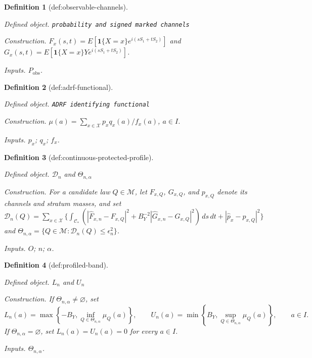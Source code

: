 \documentclass{article}
\newtheorem{definition}{Definition}
\begin{document}
\begin{definition}[def:observable-channels]\label{def:observable-channels}
\par\smallskip\noindent\emph{Defined object.} \texttt{probability and signed marked channels}
\par\smallskip\noindent\emph{Construction.} \(F_x(s,t)=E[\mathbf 1\{X=x\}e^{i(sS_1+tS_2)}]\) and \(G_x(s,t)=E[\mathbf 1\{X=x\}Ye^{i(sS_1+tS_2)}]\).
\par\smallskip\noindent\emph{Inputs.} \(P_{\mathrm{obs}}\).
\end{definition}

\begin{definition}[def:adrf-functional]\label{def:adrf-functional}
\par\smallskip\noindent\emph{Defined object.} \texttt{ADRF identifying functional}
\par\smallskip\noindent\emph{Construction.} \(\mu(a)=\sum_{x\in\mathcal X}p_xq_x(a)/f_x(a)\), \(a\in I\).
\par\smallskip\noindent\emph{Inputs.} \(p_x\); \(q_x\); \(f_x\).
\end{definition}

\begin{definition}[def:continuous-protected-profile]\label{def:continuous-protected-profile}
\par\smallskip\noindent\emph{Defined object.} \(\mathscr D_n\) and \(\Theta_{n,\alpha}\)
\par\smallskip\noindent\emph{Construction.} For a candidate law \(Q\in\mathcal M\), let \(F_{x,Q}\), \(G_{x,Q}\), and \(p_{x,Q}\) denote its channels and stratum masses, and set \(\mathscr D_n(Q)=\sum_{x\in\mathcal X}\{\int_{\mathcal C_*}(|\widehat F_{x,n}-F_{x,Q}|^2+B_Y^{-2}|\widehat G_{x,n}-G_{x,Q}|^2)\,ds\,dt+|\widehat p_x-p_{x,Q}|^2\}\) and \(\Theta_{n,\alpha}=\{Q\in\mathcal M:\mathscr D_n(Q)\le\epsilon_n^2\}\).
\par\smallskip\noindent\emph{Inputs.} \(O\); \(n\); \(\alpha\).
\end{definition}

\begin{definition}[def:profiled-band]\label{def:profiled-band}
\par\smallskip\noindent\emph{Defined object.} \(L_n\) and \(U_n\)
\par\smallskip\noindent\emph{Construction.} If \(\Theta_{n,\alpha}\neq\varnothing\), set
\[
L_n(a)=\max\left\{-B_Y,\inf_{Q\in\Theta_{n,\alpha}}\mu_Q(a)\right\},
\qquad
U_n(a)=\min\left\{B_Y,\sup_{Q\in\Theta_{n,\alpha}}\mu_Q(a)\right\},
\qquad a\in I.
\]
If \(\Theta_{n,\alpha}=\varnothing\), set \(L_n(a)=U_n(a)=0\) for every \(a\in I\).
\par\smallskip\noindent\emph{Inputs.} \(\Theta_{n,\alpha}\).
\end{definition}
\end{document}
